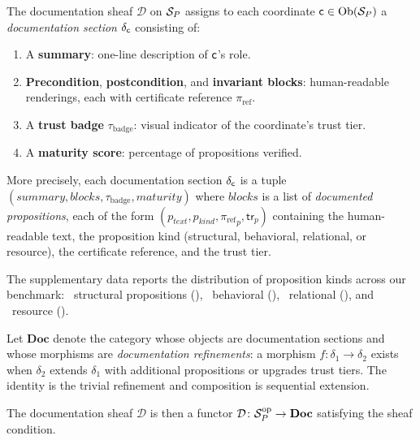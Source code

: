 \documentclass[11pt]{article}
\newcommand{\DocSheaf}{\mathcal{D}}
\newcommand{\DocSection}{\delta}
\newcommand{\TrustBadge}{\tau_{\mathrm{badge}}}
\newcommand{\CertRef}{\pi_{\mathrm{ref}}}
\newcommand{\tr}{\mathsf{tr}}                        %
\newcommand{\DocCat}{\mathbf{Doc}}                    %
\begin{document}
\begin{definition}\label{def:doc-sheaf}
The documentation sheaf $\DocSheaf$ on $\mathcal{S}_P$ assigns to each
coordinate $\mathsf{c} \in \mathrm{Ob}(\mathcal{S}_P)$ a \emph{documentation section}
$\DocSection_{\coord}$ consisting of:
\begin{enumerate}[noitemsep]
  \item A \textbf{summary}: one-line description of $\mathsf{c}$'s role.
  \item \textbf{Precondition}, \textbf{postcondition}, and
        \textbf{invariant blocks}: human-readable renderings, each
        with certificate reference $\CertRef$.
  \item A \textbf{trust badge} $\TrustBadge$: visual indicator of the
        coordinate's trust tier.
  \item A \textbf{maturity score}: percentage of propositions verified.
\end{enumerate}
\end{definition}

More precisely, each documentation section $\DocSection_{\coord}$ is a
tuple $(\mathit{summary}, \mathit{blocks}, \TrustBadge, \mathit{maturity})$
where $\mathit{blocks}$ is a list of \emph{documented propositions},
each of the form $(p_{\mathit{text}}, p_{\mathit{kind}}, {\CertRef}_{p},
\tr_{p})$ containing the human-readable text, the proposition kind
(structural, behavioral, relational, or resource), the certificate
reference, and the trust tier.

The supplementary data reports the distribution of proposition kinds
across our benchmark: \suppPropStructuralCount\ structural propositions
(\suppPropStructuralPct), \suppPropBehavioralCount\ behavioral
(\suppPropBehavioralPct), \suppPropRelationalCount\ relational
(\suppPropRelationalPct), and \suppPropResourceCount\ resource
(\suppPropResourcePct).

\begin{definition}\label{def:doc-cat}
Let $\DocCat$ denote the category whose objects are documentation
sections and whose morphisms are \emph{documentation refinements}:
a morphism $f \colon \DocSection_1 \to \DocSection_2$ exists when
$\DocSection_2$ extends $\DocSection_1$ with additional propositions
or upgrades trust tiers.  The identity is the trivial refinement and
composition is sequential extension.
\end{definition}

The documentation sheaf $\DocSheaf$ is then a functor
$\DocSheaf \colon \Site_P^{\mathrm{op}} \to \DocCat$ satisfying the
sheaf condition.
\end{document}
